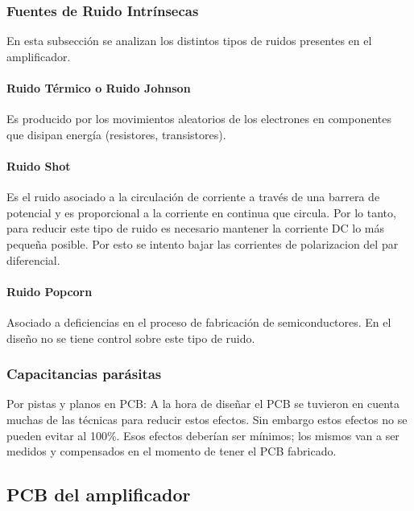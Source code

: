 \subsubsection{Fuentes de Ruido Intrínsecas}

En esta subsección se analizan los distintos tipos de ruidos presentes en el amplificador.

\paragraph{Ruido Térmico o Ruido Johnson}

Es producido por los movimientos aleatorios de los electrones en componentes que disipan energía (resistores, transistores).

\paragraph{Ruido Shot}

Es el ruido asociado a la circulación de corriente a través de una barrera de potencial y es proporcional a la corriente en continua que circula. Por lo tanto, para reducir este tipo de ruido es necesario mantener la corriente DC lo más pequeña posible. Por esto se intento bajar las corrientes de polarizacion del par diferencial.

\paragraph{Ruido Popcorn}

Asociado a deficiencias en el proceso de fabricación de semiconductores. En el diseño no se tiene control sobre este tipo de ruido.



\subsubsection{Capacitancias parásitas}


Por pistas y planos en PCB:
\newline
\newline
A la hora de diseñar el PCB se tuvieron en cuenta muchas de las técnicas para reducir estos efectos. Sin embargo estos efectos no se pueden evitar al 100\%. Esos efectos deberían ser mínimos; los mismos van a ser medidos y compensados en el momento de tener el PCB fabricado.

\clearpage


\subsection{PCB del amplificador}

